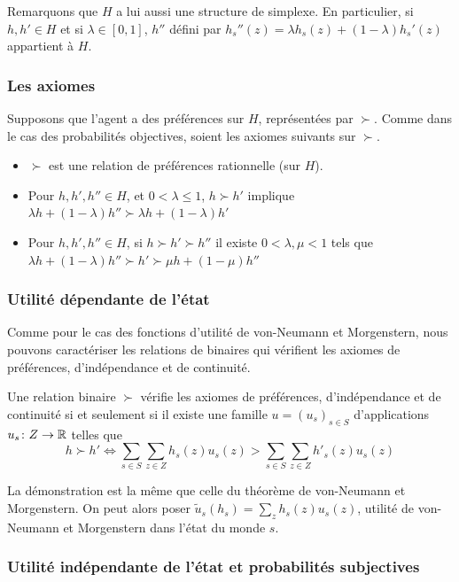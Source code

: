  Remarquons que $H$ a lui aussi une structure de simplexe. En
particulier, si $h,h'\in H$ et si $\lambda\in [0,1]$, $h''$ défini
par $h_s''(z)= \lambda h_s(z)+(1-\lambda)h_s'(z)$ appartient à
$H$.

\subsubsection{Les axiomes}
Supposons que l'agent a des préférences sur $H$, représentées par
$\succ$. Comme dans le cas des probabilités objectives, soient les
axiomes suivants sur $\succ$.

\begin{itemize}
\item[Axiome de rationalité] $\succ$ est une relation de
préférences rationnelle (sur $H$). \item[Axiome d'indépendance]
Pour $h,h',h''\in H$, et $0<\lambda\leq 1$, $h\succ h'$ implique
$\lambda h+(1-\lambda)h''\succ \lambda h+(1-\lambda)h'$
\item[Axiome de continuité] Pour $h,h',h''\in H$, si $h\succ
h'\succ h''$ il existe $0<\lambda,\mu<1$ tels que $\lambda
h+(1-\lambda)h''\succ h'\succ \mu h+(1-\mu)h''$
\end{itemize}

\subsubsection{Utilité dépendante de l'état}
Comme pour le cas des fonctions d'utilité de von-Neumann et
Morgenstern, nous pouvons caractériser les relations de binaires
qui vérifient les axiomes de  préférences, d'indépendance et de
continuité.
%
\begin{proposition}
Une relation binaire $\succ$ vérifie les axiomes de préférences,
d'indépendance et de continuité si et seulement si il existe une
famille $u=(u_s)_{s\in S}$ d'applications $u_s\colon Z\to \mathbb R$
telles que
$$
h\succ h' \Leftrightarrow \sum_{s\in S}\sum_{z\in Z}
h_s(z)u_s(z)>\sum_{s\in S}\sum_{z\in Z} h'_s(z)u_s(z)
$$
\end{proposition}

La démonstration est la m\^eme que celle du théorème de
von-Neumann et Morgenstern.
%
On peut alors poser $\tilde u_s(h_s)=\sum_z h_s(z)u_s(z)$, utilité
de von-Neumann et Morgenstern dans l'état du monde $s$.

\subsubsection{Utilité indépendante de l'état et probabilités subjectives}

